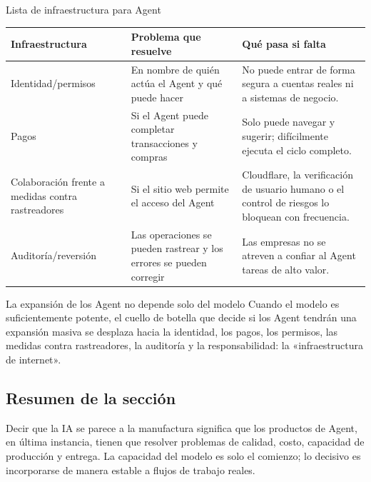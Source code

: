 \begin{knowledgebox}{Lista de infraestructura para Agent}
\begin{tabularx}{\textwidth}{p{}p{}X}
\toprule
Infraestructura & Problema que resuelve & Qué pasa si falta \\
\midrule
Identidad/permisos & En nombre de quién actúa el Agent y qué puede hacer & No puede entrar de forma segura a cuentas reales ni a sistemas de negocio. \\
Pagos & Si el Agent puede completar transacciones y compras & Solo puede navegar y sugerir; difícilmente ejecuta el ciclo completo. \\
Colaboración frente a medidas contra rastreadores & Si el sitio web permite el acceso del Agent & Cloudflare, la verificación de usuario humano o el control de riesgos lo bloquean con frecuencia. \\
Auditoría/reversión & Las operaciones se pueden rastrear y los errores se pueden corregir & Las empresas no se atreven a confiar al Agent tareas de alto valor. \\
\bottomrule
\end{tabularx}
\end{knowledgebox}

\begin{importantbox}{La expansión de los Agent no depende solo del modelo}
Cuando el modelo es suficientemente potente, el cuello de botella que decide si los Agent tendrán una expansión masiva se desplaza hacia la identidad, los pagos, los permisos, las medidas contra rastreadores, la auditoría y la responsabilidad: la «infraestructura de internet».
\end{importantbox}

\subsection{Resumen de la sección}

Decir que la IA se parece a la manufactura significa que los productos de Agent, en última instancia, tienen que resolver problemas de calidad, costo, capacidad de producción y entrega. La capacidad del modelo es solo el comienzo; lo decisivo es incorporarse de manera estable a flujos de trabajo reales.
